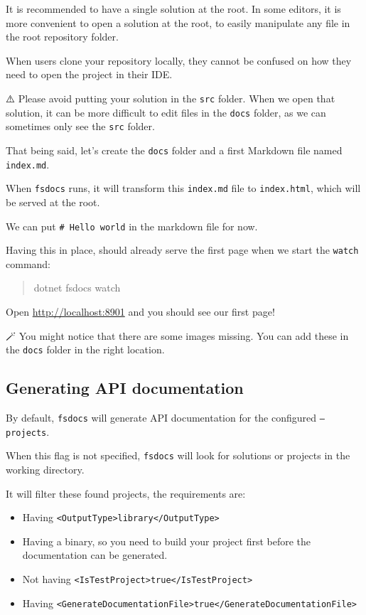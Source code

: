 \documentclass{article}
\begin{document}
It is recommended to have a single solution at the root. In some editors, it is more convenient to open a solution at the root, to easily manipulate any file in the root repository folder.

When users clone your repository locally, they cannot be confused on how they need to open the project in their IDE.


⚠️ Please avoid putting your solution in the \texttt{src} folder. When we open that solution, it can be more difficult to edit files in the \texttt{docs} folder, as we can sometimes only see the \texttt{src} folder.


That being said, let's create the \texttt{docs} folder and a first Markdown file named \texttt{index.md}.

When \texttt{fsdocs} runs, it will transform this \texttt{index.md} file to \texttt{index.html}, which will be served at the root.


We can put \texttt{\# Hello world} in the markdown file for now.


Having this in place, should already serve the first page when we start the \texttt{watch} command:
\begin{quote}


dotnet fsdocs watch
\end{quote}



Open \href{http://localhost:8901}{\href{http://localhost:8901}{http://localhost:8901}} and you should see our first page!


🪄 You might notice that there are some images missing. You can add these in the \texttt{docs} folder in the right location.
\subsection*{Generating API documentation}



By default, \texttt{fsdocs} will generate API documentation for the configured \texttt{--projects}.

When this flag is not specified, \texttt{fsdocs} will look for solutions or projects in the working directory.

It will filter these found projects, the requirements are:
\begin{itemize}
\item Having \texttt{<OutputType>library</OutputType>}

\item Having a binary, so you need to build your project first before the documentation can be generated.

\item Not having \texttt{<IsTestProject>true</IsTestProject>}

\item Having \texttt{<GenerateDocumentationFile>true</GenerateDocumentationFile>}

\end{itemize}
\end{document}
